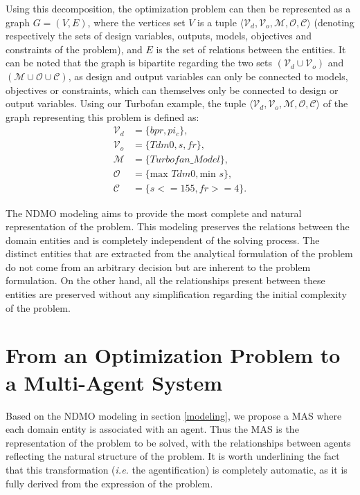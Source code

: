 Using this decomposition, the optimization problem can then be represented as a graph $ G = (V, E)$, where the vertices set $V$ is a tuple $\langle \mathcal{V}_d, \mathcal{V}_o, \mathcal{M}, \mathcal{O}, \mathcal{C}\rangle$ (denoting respectively the sets of design variables, outputs, models, objectives and constraints of the problem), and $E$ is the set of relations between the entities. It can be noted that the graph is bipartite regarding the two sets $(\mathcal{V}_d \cup \mathcal{V}_o)$ and $(\mathcal{M} \cup \mathcal{O} \cup \mathcal{C})$, as design and output variables can only be connected to models, objectives or constraints, which can themselves only be connected to design or output variables.
Using our Turbofan example, the tuple $\langle \mathcal{V}_d, \mathcal{V}_o, \mathcal{M}, \mathcal{O}, \mathcal{C}\rangle$ of the graph representing this problem is defined as:
\begin{align*}
	\mathcal{V}_d &= \{bpr, pi_c\}, \\
	\mathcal{V}_o &= \{Tdm0, s, fr\},\\
	\mathcal{M} &= \{Turbofan\_Model\},\\
	\mathcal{O} &= \{\text{max }Tdm0, \text{min }s\},\\
	\mathcal{C} &= \{s <= 155, fr >= 4\}.
\end{align*}

The NDMO modeling aims to provide the most complete and natural representation of the problem. This modeling preserves the relations between the domain entities and is completely independent of the solving process. The distinct entities that are extracted from the analytical formulation of the problem do not come from an arbitrary decision but are inherent to the problem formulation. On the other hand, all the relationships present between these entities are preserved without any simplification regarding the initial complexity of the problem.

\section{From an Optimization Problem to a Multi-Agent System}

Based on the NDMO modeling in section \ref{modeling}, we propose a MAS where each domain entity is associated with an agent. Thus the MAS is the representation of the problem to be solved, with the relationships between agents reflecting the natural structure of the problem. It is worth underlining the fact that this transformation (\textit{i.e.} the agentification) is completely automatic, as it is fully derived from the expression of the problem.

